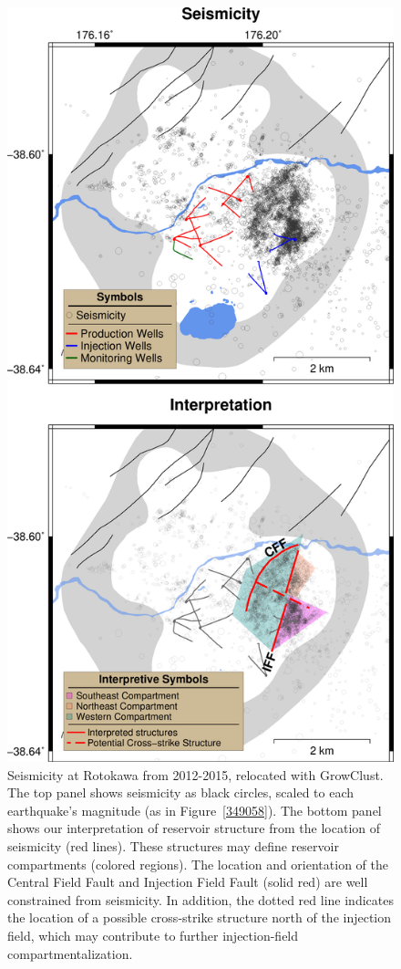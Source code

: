 \begin{figure}[h!]
\begin{center}
\includegraphics[width=0.56\columnwidth]{Chapter_4_Rot/figures/merc_Rot_dets_GC_boundaries/merc_Rot_dets_GC_boundaries_labs_original}
\caption{{Seismicity at Rotokawa from 2012-2015, relocated with GrowClust. The top
panel shows seismicity as black circles, scaled to each earthquake's
magnitude (as in Figure~{\ref{349058}}). The bottom
panel shows our interpretation of reservoir structure from the location
of seismicity (red lines). These structures may define reservoir
compartments (colored regions). The location and orientation of the
Central Field Fault and Injection Field Fault (solid red) are well
constrained from seismicity. In addition, the dotted red line indicates
the location of a possible cross-strike structure north of the injection
field, which may contribute to further injection-field
compartmentalization.
{\label{935417}}%
}}
\end{center}
\end{figure}

